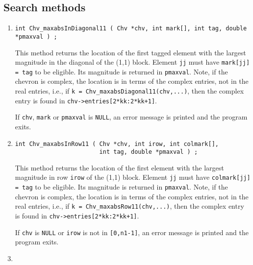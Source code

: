 \subsection{Search methods}
\label{subsection:Chv:proto:search}
\par
\begin{enumerate}
\item
\begin{verbatim}
int Chv_maxabsInDiagonal11 ( Chv *chv, int mark[], int tag, double *pmaxval ) ;
\end{verbatim}
This method returns the location of the first tagged element with the
largest magnitude in the diagonal of the (1,1) block.
Element {\tt jj} must have {\tt mark[jj] = tag} to be eligible.
Its magnitude is returned in {\tt *pmaxval}.
Note, if the chevron is complex, the location is in terms 
of the complex entries, not in the real entries, 
i.e., if {\tt k = Chv\_maxabsDiagonal11(chv,...)},
then the complex entry is found in {\tt chv->entries[2*kk:2*kk+1]}.
\par {}
If {\tt chv}, {\tt mark} or {\tt pmaxval} is {\tt NULL},
an error message is printed and the program exits.
\item
\begin{verbatim}
int Chv_maxabsInRow11 ( Chv *chv, int irow, int colmark[],
                        int tag, double *pmaxval ) ;
\end{verbatim}
This method returns the location of the first element with the
largest magnitude in row {\tt irow} of the (1,1) block.
Element {\tt jj} must have {\tt colmark[jj] = tag} to be eligible.
Its magnitude is returned in {\tt *pmaxval}.
Note, if the chevron is complex,
the location is in terms of the complex entries, not in the
real entries, i.e., if {\tt k = Chv\_maxabsRow11(chv,...)},
then the complex entry is found in {\tt chv->entries[2*kk:2*kk+1]}.
\par {}
If {\tt chv} is {\tt NULL} or {\tt irow} is not in {\tt [0,n1-1]},
an error message is printed and the program exits.
\item
\begin{verbatim}

\end{verbatim}
\end{enumerate}
